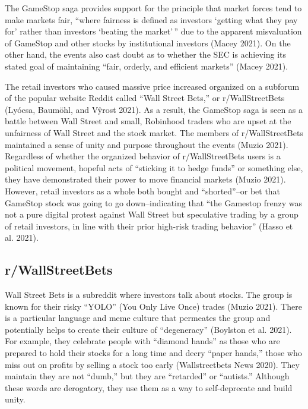 \documentclass[12pt,]{article}
\begin{document}
The GameStop saga provides support for the principle that market forces
tend to make markets fair, ``where fairness is defined as investors
`getting what they pay for' rather than investors `beating the
market'\,'' due to the apparent misvaluation of GameStop and other
stocks by institutional investors (Macey 2021). On the other hand, the
events also cast doubt as to whether the SEC is achieving its stated
goal of maintaining ``fair, orderly, and efficient markets'' (Macey
2021).

The retail investors who caused massive price increased organized on a
subforum of the popular website Reddit called ``Wall Street Bets,'' or
r/WallStreetBets (Lyócsa, Baumöhl, and Vŷrost 2021). As a result, the
GameStop saga is seen as a battle between Wall Street and small,
Robinhood traders who are upset at the unfairness of Wall Street and the
stock market. The members of r/WallStreetBets maintained a sense of
unity and purpose throughout the events (Muzio 2021). Regardless of
whether the organized behavior of r/WallStreetBets users is a political
movement, hopeful acts of ``sticking it to hedge funds'' or something
else, they have demonstrated their power to move financial markets
(Muzio 2021). However, retail investors as a whole both bought and
``shorted''--or bet that GameStop stock was going to go down--indicating
that ``the Gamestop frenzy was not a pure digital protest against Wall
Street but speculative trading by a group of retail investors, in line
with their prior high-risk trading behavior'' (Hasso et al. 2021).

\hypertarget{rwallstreetbets}{%
\subsection{r/WallStreetBets}\label{rwallstreetbets}}

Wall Street Bets is a subreddit where investors talk about stocks. The
group is known for their risky ``YOLO'' (You Only Live Once) trades
(Muzio 2021). There is a particular language and meme culture that
permeates the group and potentially helps to create their culture of
``degeneracy'' (Boylston et al. 2021). For example, they celebrate
people with ``diamond hands'' as those who are prepared to hold their
stocks for a long time and decry ``paper hands,'' those who miss out on
profits by selling a stock too early (Wallstreetbets News 2020). They
maintain they are not ``dumb,'' but they are ``retarded'' or
``autists.'' Although these words are derogatory, they use them as a way
to self-deprecate and build unity.
\end{document}
